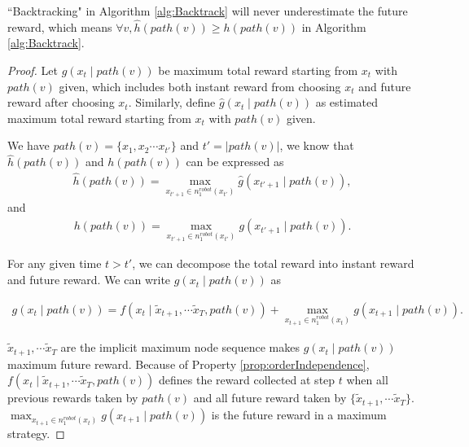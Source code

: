 \documentclass[12pt]{article}
\begin{document}
\begin{lem}
\label{lem:underestimate}
``Backtracking" in Algorithm \ref{alg:Backtrack} will never underestimate the future reward, which means $ \forall v, \hat{h}(path(v)) \geq h(path(v)) $ in Algorithm \ref{alg:Backtrack}.
\begin{proof}

Let $ g(x_{t} \mid path(v)) $ be maximum total reward starting from $ x_{t} $ with $ path(v) $ given, which includes both instant reward from choosing $ x_{t} $ and future reward after choosing $ x_{t} $. Similarly, define $ \hat{g}(x_{t} \mid path(v)) $ as estimated maximum total reward starting from $ x_{t} $ with $ path(v) $ given.

We have $ path(v) = \{ x_{1}, x_{2} \cdots x_{t'} \} $ and $ t' = \left| path(v) \right| $, we know that $ \hat{h}(path(v)) $ and $ h(path(v)) $ can be expressed as 
\begin{equation}
\label{eq:defHatH}
\begin{aligned}
\hat{h}(path(v)) = \max_{x_{t'+1} \in n^{robot}_{1}(x_{t'})} \hat{g}(x_{t'+1} \mid path(v)),
\end{aligned}
\end{equation}
and
\begin{equation}
\label{eq:defH}
\begin{aligned}
h(path(v)) = \max_{x_{t'+1} \in n^{robot}_{1}(x_{t'})} g(x_{t'+1} \mid path(v)).
\end{aligned}
\end{equation}

For any given time $ t > t' $, we can decompose the total reward into instant reward and future reward. We can write $ g(x_{t} \mid path(v)) $  as

\begin{equation}
\label{eq:defG}
\begin{aligned}
g(x_{t} \mid path(v)) = f(x_{t} \mid \tilde{x}_{t+1}, \cdots \tilde{x}_{T}, path(v)) +  \max_{x_{t+1} \in n^{robot}_{1}(x_{t})} g(x_{t+1} \mid path(v)).
\end{aligned}
\end{equation}

$ \tilde{x}_{t+1}, \cdots \tilde{x}_{T} $ are the implicit maximum node sequence makes $ g(x_{t} \mid path(v)) $ maximum future reward. Because of Property \ref{prop:orderIndependence}, $ f(x_{t} \mid \tilde{x}_{t+1}, \cdots \tilde{x}_{T}, path(v)) $ defines the reward collected at step $ t $ when all previous rewards taken by $ path(v) $ and all future reward taken by $ \{ \tilde{x}_{t+1}, \cdots \tilde{x}_{T} \} $. 
$ \max_{x_{t+1} \in n^{robot}_{1}(x_{t})} g(x_{t+1} \mid path(v)) $ is the future reward in a maximum strategy.


\end{proof}
\end{lem}
\end{document}

